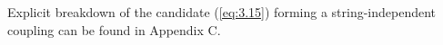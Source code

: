 \documentclass[12pt,a4paper]{article}
\numberwithin{equation}{section}
\begin{document}
Explicit breakdown of the candidate (\ref{eq:3.15}) forming a string-independent coupling can be found in Appendix C. 
\end{document}

